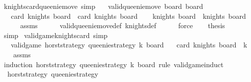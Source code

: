 \begin{isabellebody}
%
\endisatagproof
{\isafoldproof}%
%
\isadelimproof
\isanewline
%
\endisadelimproof
\isanewline
{}\isamarkupfalse%
\ knights{\isacharunderscore}card{\isacharunderscore}queenie{\isacharunderscore}move\ {\isacharbrackleft}simp{\isacharbrackright}{\isacharcolon}\isanewline
\ \ \ {\isachardoublequoteopen}valid{\isacharunderscore}queenie{\isacharunderscore}move\ board\ board{\isacharprime}{\isachardoublequoteclose}\isanewline
\ \ \ {\isachardoublequoteopen}card\ {\isacharparenleft}knights\ board{\isacharprime}{\isacharparenright}\ {\isacharequal}\ card\ {\isacharparenleft}knights\ board{\isacharparenright}{\isachardoublequoteclose}\isanewline
%
\isadelimproof
%
\endisadelimproof
%
\isatagproof
{}\isamarkupfalse%
{\isacharminus}\isanewline
\ \ \isamarkupfalse%
\ {\isachardoublequoteopen}knights\ board{\isacharprime}\ {\isacharequal}\ knights\ board{\isachardoublequoteclose}\isanewline
\ \ \ \ \isamarkupfalse%
\ assms\isanewline
\ \ \ \ \isamarkupfalse%
\ valid{\isacharunderscore}queenie{\isacharunderscore}move{\isacharunderscore}def\ knights{\isacharunderscore}def\isanewline
\ \ \ \ \isamarkupfalse%
\ force\isanewline
\ \ \isamarkupfalse%
\ {\isacharquery}thesis\isanewline
\ \ \ \ \isamarkupfalse%
\ simp\isanewline
{}\isamarkupfalse%
%
\endisatagproof
{\isafoldproof}%
%
\isadelimproof
\isanewline
%
\endisadelimproof
\isanewline
{}\isamarkupfalse%
\ valid{\isacharunderscore}game{\isacharunderscore}knights{\isacharunderscore}card\ {\isacharbrackleft}simp{\isacharbrackright}{\isacharcolon}\isanewline
\ \ \ {\isachardoublequoteopen}valid{\isacharunderscore}game\ horst{\isacharunderscore}strategy\ queenie{\isacharunderscore}strategy\ k\ board{\isachardoublequoteclose}\isanewline
\ \ \ {\isachardoublequoteopen}card\ {\isacharparenleft}knights\ board{\isacharparenright}\ {\isacharequal}\ k{\isachardoublequoteclose}\isanewline
%
\isadelimproof
\ \ %
\endisadelimproof
%
\isatagproof
{}\isamarkupfalse%
\ assms\isanewline
{}\isamarkupfalse%
\ {\isacharparenleft}induction\ horst{\isacharunderscore}strategy\ queenie{\isacharunderscore}strategy\ k\ board\ rule{\isacharcolon}\ valid{\isacharunderscore}game{\isachardot}induct{\isacharparenright}\isanewline
\ \ \isamarkupfalse%
\ {\isacharparenleft}{}\ horst{\isacharunderscore}strategy\ queenie{\isacharunderscore}strategy{\isacharparenright}\isanewline

\end{isabellebody}
